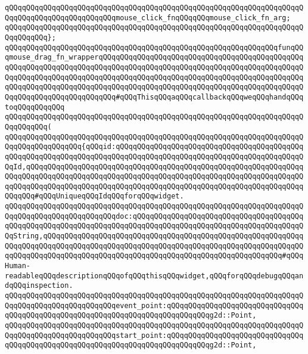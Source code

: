 \newline
\verb|qQQqqQQqqQQqqQQqqQQqqQQqqQQqqQQqqQQqqQQqqQQqqQQqqQQqqQQqqQQqqQQqqQQqqQQqqQQqqQQqqQQqqQQqqQQqqQQqmouse_click_fnqQQqqQQqmouse_click_fn_arg;|\newline
\verb|qQQqqQQqqQQqqQQqqQQqqQQqqQQqqQQqqQQqqQQqqQQqqQQqqQQqqQQqqQQqqQQqqQQqqQQqqQQqqQQq};|\newline
\newline
\verb|qQQqqQQqqQQqqQQqqQQqqQQqqQQqqQQqqQQqqQQqqQQqqQQqqQQqqQQqqQQqqQQqfunqQQqmouse_drag_fn_wrapperqQQqqQQqqQQqqQQqqQQqqQQqqQQqqQQqqQQqqQQqqQQqqQQqqQQqqQQqqQQqqQQqqQQqqQQqqQQqqQQqqQQqqQQqqQQqqQQqqQQqqQQqqQQqqQQqqQQqqQQqqQQqqQQqqQQqqQQqqQQqqQQqqQQqqQQqqQQqqQQqqQQqqQQqqQQqqQQqqQQqqQQqqQQqqQQqqQQqqQQqqQQqqQQqqQQqqQQqqQQqqQQqqQQqqQQqqQQqqQQqqQQqqQQqqQQqqQQqqQQqqQQqqQQqqQQqqQQqqQQqqQQq#qQQqThisqQQqaqQQqcallbackqQQqweqQQqhandqQQqtoqQQqqQQqqQQq|\newline
\verb|qQQqqQQqqQQqqQQqqQQqqQQqqQQqqQQqqQQqqQQqqQQqqQQqqQQqqQQqqQQqqQQqqQQqqQQqqQQqqQQq(|\newline
\verb|qQQqqQQqqQQqqQQqqQQqqQQqqQQqqQQqqQQqqQQqqQQqqQQqqQQqqQQqqQQqqQQqqQQqqQQqqQQqqQQqqQQqqQQq{qQQqid:qQQqqQQqqQQqqQQqqQQqqQQqqQQqqQQqqQQqqQQqqQQqqQQqqQQqqQQqqQQqqQQqqQQqqQQqqQQqqQQqqQQqqQQqqQQqqQQqqQQqqQQqqQQqqQQqqQQqId,qQQqqQQqqQQqqQQqqQQqqQQqqQQqqQQqqQQqqQQqqQQqqQQqqQQqqQQqqQQqqQQqqQQqqQQqqQQqqQQqqQQqqQQqqQQqqQQqqQQqqQQqqQQqqQQqqQQqqQQqqQQqqQQqqQQqqQQqqQQqqQQqqQQqqQQqqQQqqQQqqQQqqQQqqQQqqQQqqQQqqQQqqQQqqQQqqQQqqQQqqQQqqQQqqQQq#qQQqUniqueqQQqIdqQQqforqQQqwidget.|\newline
\verb|qQQqqQQqqQQqqQQqqQQqqQQqqQQqqQQqqQQqqQQqqQQqqQQqqQQqqQQqqQQqqQQqqQQqqQQqqQQqqQQqqQQqqQQqqQQqqQQqdoc:qQQqqQQqqQQqqQQqqQQqqQQqqQQqqQQqqQQqqQQqqQQqqQQqqQQqqQQqqQQqqQQqqQQqqQQqqQQqqQQqqQQqqQQqqQQqqQQqqQQqqQQqqQQqqQQqString,qQQqqQQqqQQqqQQqqQQqqQQqqQQqqQQqqQQqqQQqqQQqqQQqqQQqqQQqqQQqqQQqqQQqqQQqqQQqqQQqqQQqqQQqqQQqqQQqqQQqqQQqqQQqqQQqqQQqqQQqqQQqqQQqqQQqqQQqqQQqqQQqqQQqqQQqqQQqqQQqqQQqqQQqqQQqqQQqqQQqqQQqqQQqqQQqqQQq#qQQqHuman-readableqQQqdescriptionqQQqofqQQqthisqQQqwidget,qQQqforqQQqdebugqQQqandqQQqinspection.|\newline
\verb|qQQqqQQqqQQqqQQqqQQqqQQqqQQqqQQqqQQqqQQqqQQqqQQqqQQqqQQqqQQqqQQqqQQqqQQqqQQqqQQqqQQqqQQqqQQqqQQqevent_point:qQQqqQQqqQQqqQQqqQQqqQQqqQQqqQQqqQQqqQQqqQQqqQQqqQQqqQQqqQQqqQQqqQQqqQQqqQQqqQQqg2d::Point,|\newline
\verb|qQQqqQQqqQQqqQQqqQQqqQQqqQQqqQQqqQQqqQQqqQQqqQQqqQQqqQQqqQQqqQQqqQQqqQQqqQQqqQQqqQQqqQQqqQQqqQQqstart_point:qQQqqQQqqQQqqQQqqQQqqQQqqQQqqQQqqQQqqQQqqQQqqQQqqQQqqQQqqQQqqQQqqQQqqQQqqQQqqQQqg2d::Point,|\newline
